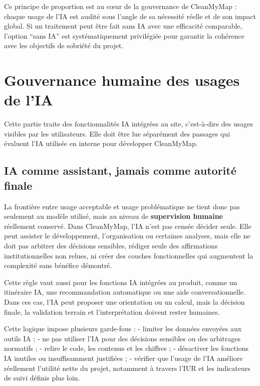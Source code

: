 \documentclass[
  10pt,
  a4paper,
  DIV=11,
  numbers=noendperiod,
  oneside]{scrreprt}
\let\oldtextbf\textbf
\renewcommand{\textbf}[1]{\oldtextbf{\textcolor{cmmnavy}{#1}}}
\begin{document}
Ce principe de proportion est au cœur de la gouvernance de CleanMyMap :
chaque usage de l'IA est audité sous l'angle de sa nécessité réelle et
de son impact global. Si un traitement peut être fait sans IA avec une
efficacité comparable, l'option ``sans IA'' est systématiquement
privilégiée pour garantir la cohérence avec les objectifs de sobriété du
projet.

\section{Gouvernance humaine des usages de
l'IA}\label{gouvernance-humaine-des-usages-de-lia}

Cette partie traite des fonctionnalités IA intégrées au site,
c'est-à-dire des usages visibles par les utilisateurs. Elle doit être
lue séparément des passages qui évaluent l'IA utilisée en interne pour
développer CleanMyMap.

\subsection{IA comme assistant, jamais comme autorité
finale}\label{ia-comme-assistant-jamais-comme-autorituxe9-finale}

La frontière entre usage acceptable et usage problématique ne tient donc
pas seulement au modèle utilisé, mais au niveau de \textbf{supervision
humaine} réellement conservé. Dans CleanMyMap, l'IA n'est pas censée
décider seule. Elle peut assister le développement, l'organisation ou
certaines analyses, mais elle ne doit pas arbitrer des décisions
sensibles, rédiger seule des affirmations institutionnelles non relues,
ni créer des couches fonctionnelles qui augmentent la complexité sans
bénéfice démontré.

Cette règle vaut aussi pour les fonctions IA intégrées au produit, comme
un itinéraire IA, une recommandation automatique ou une aide
conversationnelle. Dans ces cas, l'IA peut proposer une orientation ou
un calcul, mais la décision finale, la validation terrain et
l'interprétation doivent rester humaines.

Cette logique impose plusieurs garde-fous : - limiter les données
envoyées aux outils IA ; - ne pas utiliser l'IA pour des décisions
sensibles ou des arbitrages normatifs ; - relire le code, les contenus
et les chiffres ; - désactiver les fonctions IA inutiles ou
insuffisamment justifiées ; - vérifier que l'usage de l'IA améliore
réellement l'utilité nette du projet, notamment à travers l'IUR et les
indicateurs de suivi définis plus loin.
\end{document}
